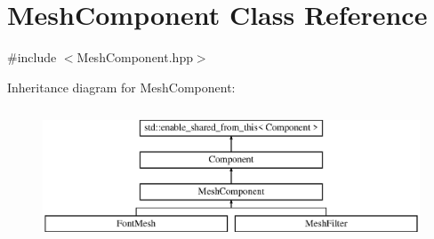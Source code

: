 \hypertarget{class_mesh_component}{}\section{Mesh\+Component Class Reference}
\label{class_mesh_component}


{\ttfamily \#include $<$Mesh\+Component.\+hpp$>$}

Inheritance diagram for Mesh\+Component\+:\begin{figure}[H]
\begin{center}
\leavevmode
\includegraphics[height=4.000000cm]{class_mesh_component}
\end{center}
\end{figure}
